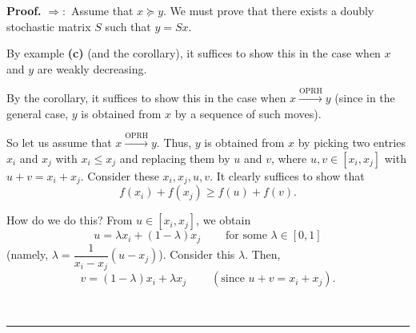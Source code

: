 \documentclass[numbers=enddot,12pt,final,onecolumn,notitlepage]{scrartcl}%
\numberwithin{exer}{subsection}
\theoremstyle{definition}
\newenvironment{proof}[1][Proof]{\noindent\textbf{#1.} }{\ \rule{0.5em}{0.5em}}
\begin{document}
\begin{proof}
$\Longrightarrow:$ Assume that $x\succcurlyeq y$. We must prove that there
exists a doubly stochastic matrix $S$ such that $y=Sx$.

By example \textbf{(c)} (and the corollary), it suffices to show this in the
case when $x$ and $y$ are weakly decreasing.

By the corollary, it suffices to show this in the case when
$x\overset{\text{OPRH}}{\longrightarrow}y$ (since in the general case, $y$ is
obtained from $x$ by a sequence of such moves).

So let us assume that $x\overset{\text{OPRH}}{\longrightarrow}y$. Thus, $y$ is
obtained from $x$ by picking two entries $x_{i}$ and $x_{j}$ with $x_{i}\leq
x_{j}$ and replacing them by $u$ and $v$, where $u,v\in\left[  x_{i}%
,x_{j}\right]  $ with $u+v=x_{i}+x_{j}$. Consider these $x_{i},x_{j},u,v$. It
clearly suffices to show that%
\[
f\left(  x_{i}\right)  +f\left(  x_{j}\right)  \geq f\left(  u\right)
+f\left(  v\right)  .
\]


How do we do this? From $u\in\left[  x_{i},x_{j}\right]  $, we obtain
\[
u=\lambda x_{i}+\left(  1-\lambda\right)  x_{j}\ \ \ \ \ \ \ \ \ \ \text{for
some }\lambda\in\left[  0,1\right]
\]
(namely, $\lambda=\dfrac{1}{x_{i}-x_{j}}\left(  u-x_{j}\right)  $). Consider
this $\lambda$. Then,%
\[
v=\left(  1-\lambda\right)  x_{i}+\lambda x_{j}\ \ \ \ \ \ \ \ \ \ \left(
\text{since }u+v=x_{i}+x_{j}\right)  .
\]



\end{proof}
\end{document}
